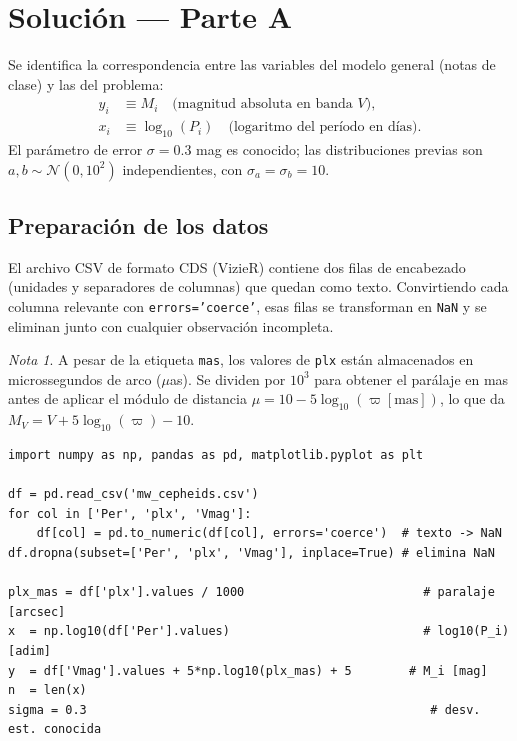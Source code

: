 \documentclass[a4paper,11pt]{article}
\theoremstyle{remark}
\newtheorem*{nota}{Nota}
\begin{document}
\section*{Solución --- Parte A}

Se identifica la correspondencia entre las variables del modelo general
(notas de clase) y las del problema:
\begin{align*}
  y_i &\equiv M_i \quad \text{(magnitud absoluta en banda }V\text{)},\\
  x_i &\equiv \log_{10}(P_i) \quad \text{(logaritmo del período en días)}.
\end{align*}
El parámetro de error $\sigma = 0.3$ mag es conocido; las distribuciones
previas son $a,b\sim\mathcal{N}(0,10^2)$ independientes, con
$\sigma_a = \sigma_b = 10$.

\subsection*{Preparación de los datos}

El archivo CSV de formato CDS (VizieR) contiene dos filas de encabezado
(unidades y separadores de columnas) que quedan como texto.
Convirtiendo cada columna relevante con \texttt{errors='coerce'},
esas filas se transforman en \texttt{NaN} y se eliminan junto con
cualquier observación incompleta.

\begin{nota}
  A pesar de la etiqueta \texttt{mas}, los valores de \texttt{plx}
  están almacenados en microssegundos de arco ($\mu$as). Se dividen por
  $10^3$ para obtener el parálaje en mas antes de aplicar el módulo de
  distancia $\mu = 10 - 5\log_{10}(\varpi[\text{mas}])$, lo que da
  $M_V = V + 5\log_{10}(\varpi) - 10$.
\end{nota}

\begin{lstlisting}
import numpy as np, pandas as pd, matplotlib.pyplot as plt

df = pd.read_csv('mw_cepheids.csv')
for col in ['Per', 'plx', 'Vmag']:
    df[col] = pd.to_numeric(df[col], errors='coerce')  # texto -> NaN
df.dropna(subset=['Per', 'plx', 'Vmag'], inplace=True) # elimina NaN

plx_mas = df['plx'].values / 1000                         # paralaje [arcsec]
x  = np.log10(df['Per'].values)                           # log10(P_i) [adim]
y  = df['Vmag'].values + 5*np.log10(plx_mas) + 5        # M_i [mag]
n  = len(x)
sigma = 0.3                                                # desv. est. conocida
\end{lstlisting}
\end{document}
